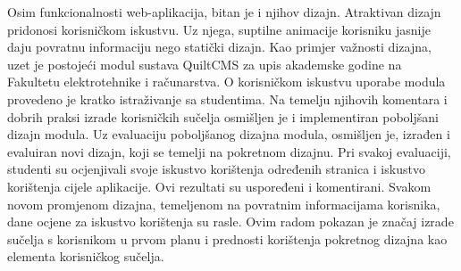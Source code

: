 \documentclass[times, utf8, zavrsni, numeric]{fer}
\begin{document}
\begin{sazetak}

Osim funkcionalnosti web-aplikacija, bitan je i njihov dizajn. Atraktivan dizajn pridonosi korisničkom iskustvu. Uz njega, suptilne animacije korisniku jasnije daju povratnu informaciju nego statički dizajn. Kao primjer važnosti dizajna, uzet je postojeći modul sustava QuiltCMS za upis akademske godine na Fakultetu elektrotehnike i računarstva. O korisničkom iskustvu uporabe modula provedeno je kratko istraživanje sa studentima. Na temelju njihovih komentara i dobrih praksi izrade korisničkih sučelja osmišljen je i implementiran poboljšani dizajn modula. Uz evaluaciju poboljšanog dizajna modula, osmišljen je, izrađen i evaluiran novi dizajn, koji se temelji na pokretnom dizajnu. Pri svakoj evaluaciji, studenti su ocjenjivali svoje iskustvo korištenja određenih stranica i iskustvo korištenja cijele aplikacije. Ovi rezultati su uspoređeni i komentirani. Svakom novom promjenom dizajna, temeljenom na povratnim informacijama korisnika, dane ocjene za iskustvo korištenja su rasle. Ovim radom pokazan je značaj izrade sučelja s korisnikom u prvom planu i prednosti korištenja pokretnog dizajna kao elementa korisničkog sučelja.



\end{sazetak}
\end{document}
